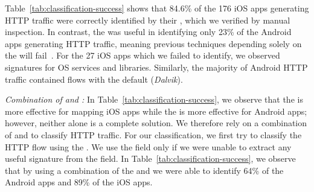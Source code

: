 Table~\ref{tab:classification-success} shows that 84.6\% of the 176 iOS apps generating HTTP traffic were correctly identified by their \useragent, which we verified by manual inspection.
In contrast, the \useragent was useful in identifying only 23\% of the Android apps generating HTTP traffic, meaning previous techniques depending solely on the \useragent will fail~\cite{maier:mobtraffic,xu:appusage}. 
For the 27 iOS apps which we failed to identify, we observed signatures for OS services and libraries.
Similarly, the majority of Android HTTP traffic contained flows with the default \useragent (\eg \emph{Dalvik}).

\emph{Combination of \useragent and \httphost:} 
In Table~\ref{tab:classification-success}, we observe that the \useragent is more effective for mapping iOS apps while the \httphost is more effective for Android apps; however, neither alone is a complete solution. 
We therefore rely on a combination of \useragent and \httphost to classify HTTP traffic. 
For our classification, we first try to classify the HTTP flow using the \useragent.
We use the \httphost field only if we were unable to extract any useful signature from the \useragent field. 
In Table~\ref{tab:classification-success}, we observe that by using a combination of the \useragent and \httphost we were able to identify 64\% of the Android apps and 89\% of the iOS apps. 


